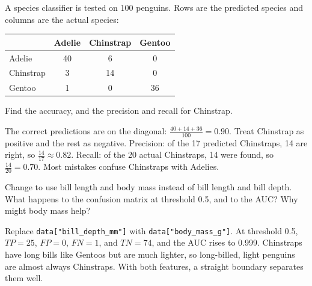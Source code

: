 \begin{Exercise}[label=conf5, title={Three classes}]
A species classifier is tested on 100 penguins. Rows are the predicted species and columns are the actual
species:
\begin{center}
\small\setlength{\tabcolsep}{4pt}
\begin{tabular}{l c c c}
 & Adelie & Chinstrap & Gentoo \\
\hline
Adelie & 40 & 6 & 0 \\
Chinstrap & 3 & 14 & 0 \\
Gentoo & 1 & 0 & 36 \\
\end{tabular}
\end{center}
Find the accuracy, and the precision and recall for Chinstrap.
\end{Exercise}
\begin{Answer}[ref=conf5]
The correct predictions are on the diagonal: $\frac{40 + 14 + 36}{100} = 0.90$. Treat Chinstrap as positive and
the rest as negative. Precision: of the 17 predicted Chinstraps, 14 are right, so $\frac{14}{17} \approx 0.82$.
Recall: of the 20 actual Chinstraps, 14 were found, so $\frac{14}{20} = 0.70$. Most mistakes confuse Chinstraps
with Adelies.
\end{Answer}

\begin{Exercise}[label=conf6, title={A better detector}]
Change  to use bill length and body mass instead of bill length and bill depth. What
happens to the confusion matrix at threshold 0.5, and to the AUC? Why might body mass help?
\end{Exercise}
\begin{Answer}[ref=conf6]
Replace \verb|data["bill_depth_mm"]| with \verb|data["body_mass_g"]|. At threshold 0.5, $TP = 25$, $FP = 0$,
$FN = 1$, and $TN = 74$, and the AUC rises to 0.999. Chinstraps have long bills like Gentoos but are much lighter,
so long-billed, light penguins are almost always Chinstraps. With both features, a straight boundary separates
them well.
\end{Answer}

